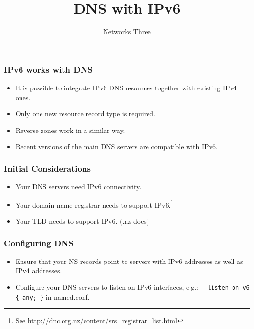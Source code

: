 \documentclass[10pt]{beamer}
\title{DNS with IPv6}
\author[IN715]{Networks Three}
\institute[Otago Polytechnic]{
  Otago Polytechnic \\
  Dunedin, New Zealand \\
}
\date{}
\begin{document}
\begin{frame}[plain]
  \titlepage
\end{frame}


\begin{frame}
  \frametitle{IPv6 works with DNS}

 \begin{itemize}
  \item It is possible to integrate IPv6 DNS resources together with
        existing IPv4 ones.
  \item Only one new resource record type is required.
  \item Reverse zones work in a similar way.
  \item Recent versions of the main DNS servers are compatible with IPv6.
 \end{itemize}
\end{frame}
\begin{frame}
  \frametitle{Initial Considerations}

 \begin{itemize}
  \item Your DNS servers need IPv6 connectivity.
  \item Your domain name registrar needs to support IPv6.\footnote{See http://dnc.org.nz/content/srs\_registrar\_list.html}
  \item Your TLD needs to support IPv6. (.nz does)
 \end{itemize}
\end{frame}
\begin{frame}
  \frametitle{Configuring DNS}

 \begin{itemize}
  \item Ensure that your NS records point to servers with IPv6 addresses as well as IPv4 addresses.
  \item Configure your DNS servers to listen on IPv6 interfaces, e.g.: \
          \texttt{ listen-on-v6 \{ any; \}} in named.conf.
 \end{itemize}
\end{frame}
\end{document}

